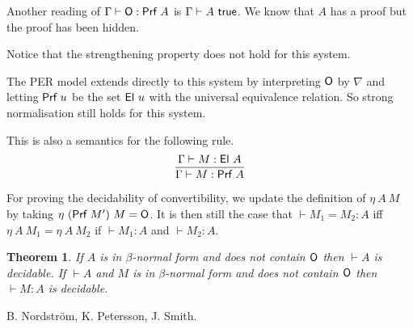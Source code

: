 \documentclass[11pt]{article}
\newtheorem{theorem}{Theorem}[section]
\def\EL{\hbox{\sf El}}
\def\PROOF{\hbox{\sf Prf}}
\def\ZERO{\hbox{\sf O}}
\def\TRUE{\hbox{\sf true}}
\begin{document}
 Another reading of $\Gamma\vdash \ZERO:\PROOF~A$ is $\Gamma\vdash A~\TRUE$. We know
that $A$ has a proof but the proof has been hidden.

 


 Notice that the strengthening property does not hold for this system.

 The PER model extends directly to this system by interpreting $\ZERO$
by $\nabla$ and letting $\PROOF~u$ be the set $\EL~u$ with the universal
equivalence relation. So strong normalisation still holds for this system.

 This is also a semantics for the following rule.
$$
\frac{\Gamma\vdash M:\EL~A}{\Gamma\vdash M:\PROOF~A}
$$

 For proving the decidability of convertibility, we update the
definition of $\eta~A~M$ by taking $\eta~(\PROOF~M')~M = \ZERO$. It is then still
the case that $\vdash M_1=M_2:A$ iff $\eta~A~M_1=\eta~A~M_2$ if
$\vdash M_1:A$ and $\vdash M_2:A$.

\begin{theorem}
If $A$ is in $\beta$-normal form and does not contain $\ZERO$
then $\vdash A$ is decidable. If $\vdash A$ and $M$ is
in $\beta$-normal form and does not contain $\ZERO$ then $\vdash M:A$ is decidable.
\end{theorem}



\begin{thebibliography}{9}

B. Nordstr\"om, K. Petersson, J. Smith.



\end{thebibliography}
\end{document}

